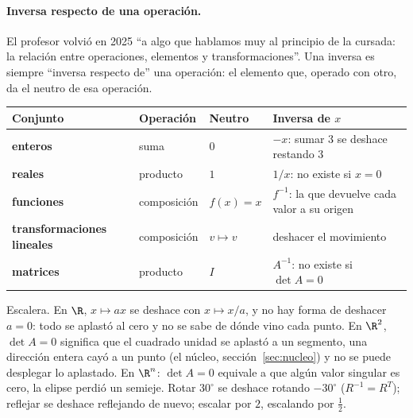 \paragraph{Inversa respecto de una operación.} El profesor volvió en 2025 ``a algo que
hablamos muy al principio de la cursada: la relación entre operaciones, elementos y
transformaciones''. Una inversa es siempre ``inversa respecto de'' una operación: el
elemento que, operado con otro, da el neutro de esa operación.

{\small
\begin{center}
\begin{tabularx}{.92\textwidth}{>{\bfseries}l l l Y}
\toprule
Conjunto & Operación & Neutro & Inversa de \(x\)\\
\midrule
enteros & suma & \(0\) & \(-x\): sumar \(3\) se deshace restando \(3\)\\
reales & producto & \(1\) & \(1/x\): no existe si \(x=0\)\\
funciones & composición & \(f(x)=x\) & \(f^{-1}\): la que devuelve cada valor a su origen\\
transformaciones lineales & composición & \(v\mapsto v\) & deshacer el movimiento\\
matrices & producto & \(I\) & \(A^{-1}\): no existe si \(\det A=0\)\\
\bottomrule
\end{tabularx}
\end{center}
}

Escalera. En \(\R\), \(x\mapsto ax\) se deshace con \(x\mapsto x/a\), y no hay forma de
deshacer \(a=0\): todo se aplastó al cero y no se sabe de dónde vino cada punto. En
\(\R^2\), \(\det A=0\) significa que el cuadrado unidad se aplastó a un segmento, una
dirección entera cayó a un punto (el núcleo, sección~\ref{sec:nucleo}) y no se puede
desplegar lo aplastado. En \(\R^n\): \(\det A=0\) equivale a que algún valor singular es
cero, la elipse perdió un semieje. Rotar \(30^\circ\) se deshace rotando \(-30^\circ\)
(\(R^{-1}=R^T\)); reflejar se deshace reflejando de nuevo; escalar por \(2\), escalando
por \(\tfrac12\).

